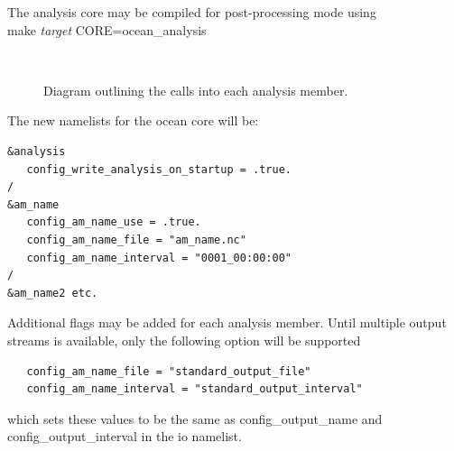 \documentclass[11pt]{report}
\begin{document}
The analysis core may be compiled for post-processing mode using\\
make {\it target} CORE=ocean\_analysis

\begin{figure}[tb]
 \\
\caption{Diagram outlining the calls into each analysis member.}
\label{OAC-AM}
\end{figure}

The new namelists for the ocean core will be:
\begin{verbatim}
&analysis
   config_write_analysis_on_startup = .true.
/
&am_name
   config_am_name_use = .true.
   config_am_name_file = "am_name.nc"
   config_am_name_interval = "0001_00:00:00"
/
&am_name2 etc.
\end{verbatim}
Additional flags may be added for each analysis member.
Until multiple output streams is available, only the following option will be supported
\begin{verbatim}
   config_am_name_file = "standard_output_file"
   config_am_name_interval = "standard_output_interval"
\end{verbatim}
which sets these values to be the same as config\_output\_name and config\_output\_interval in the io namelist.
\end{document}
